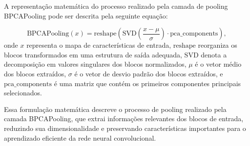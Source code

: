 A representação matemática do processo realizado pela camada de pooling BPCAPooling pode ser descrita pela seguinte equação:

\[
\text{{BPCAPooling}}(x) = \text{{reshape}}\left(\text{{SVD}}\left(\frac{{x - \mu}}{{\sigma}}\right) \cdot \text{{pca\_components}}\right),
\]
onde $x$ representa o mapa de características de entrada, $\text{{reshape}}$ reorganiza os blocos transformados em uma estrutura de saída adequada, $\text{{SVD}}$ denota a decomposição em valores singulares dos blocos normalizados, $\mu$ é o vetor médio dos blocos extraídos, $\sigma$ é o vetor de desvio padrão dos blocos extraídos, e $\text{{pca\_components}}$ é uma matriz que contém os primeiros componentes principais selecionados.

Essa formulação matemática descreve o processo de pooling realizado pela camada BPCAPooling, que extrai informações relevantes dos blocos de entrada, reduzindo sua dimensionalidade e preservando características importantes para o aprendizado eficiente da rede neural convolucional.

